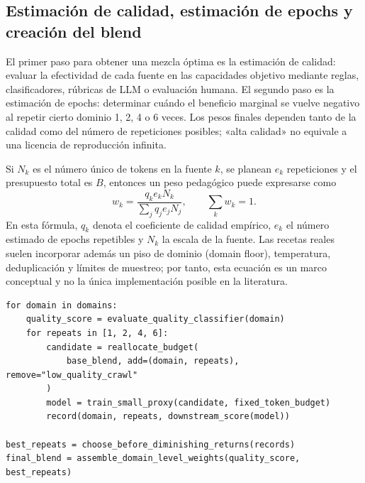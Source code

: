 \subsection{Estimación de calidad, estimación de epochs y creación del blend}

El primer paso para obtener una mezcla óptima es la estimación de calidad: evaluar la efectividad de cada fuente en las capacidades objetivo mediante reglas, clasificadores, rúbricas de LLM o evaluación humana. El segundo paso es la estimación de epochs: determinar cuándo el beneficio marginal se vuelve negativo al repetir cierto dominio 1, 2, 4 o 6 veces. Los pesos finales dependen tanto de la calidad como del número de repeticiones posibles; «alta calidad» no equivale a una licencia de reproducción infinita.


Si $N_k$ es el número único de tokens en la fuente $k$, se planean $e_k$ repeticiones y el presupuesto total es $B$, entonces un peso pedagógico puede expresarse como
\[
w_k=\frac{q_k e_k N_k}{\sum_j q_j e_j N_j},
\qquad
\sum_k w_k=1.
\]
En esta fórmula, $q_k$ denota el coeficiente de calidad empírico, $e_k$ el número estimado de epochs repetibles y $N_k$ la escala de la fuente. Las recetas reales suelen incorporar además un piso de dominio (domain floor), temperatura, deduplicación y límites de muestreo; por tanto, esta ecuación es un marco conceptual y no la única implementación posible en la literatura.

\begin{lstlisting}[caption={Versión pedagógica del pseudocódigo para el abanico de calidad y repeticiones a nivel de dominio}]
for domain in domains:
    quality_score = evaluate_quality_classifier(domain)
    for repeats in [1, 2, 4, 6]:
        candidate = reallocate_budget(
            base_blend, add=(domain, repeats), remove="low_quality_crawl"
        )
        model = train_small_proxy(candidate, fixed_token_budget)
        record(domain, repeats, downstream_score(model))

best_repeats = choose_before_diminishing_returns(records)
final_blend = assemble_domain_level_weights(quality_score, best_repeats)
\end{lstlisting}


